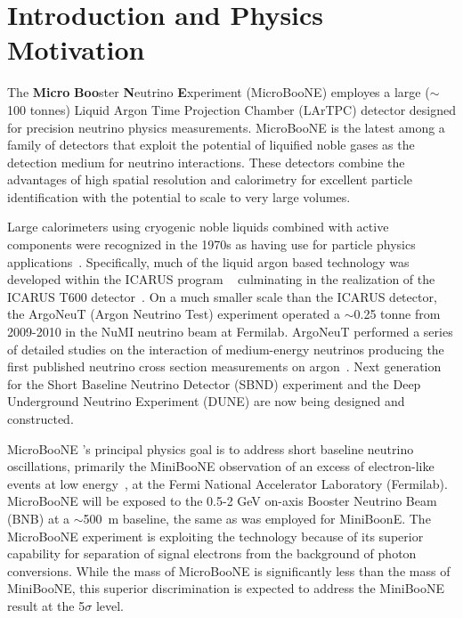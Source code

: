 \section{Introduction and Physics Motivation}

The {\bf{Micro}} {\bf{Boo}}ster {\bf{N}}eutrino {\bf{E}}xperiment (MicroBooNE) employes a large ($\sim$100 tonnes) Liquid Argon Time Projection Chamber (LArTPC) detector designed for precision neutrino physics measurements.   MicroBooNE is the latest among a family of detectors that exploit the potential of liquified noble gases as the detection medium for neutrino interactions.   These detectors combine the advantages of high spatial resolution and calorimetry for excellent particle identification with the potential to scale to very large volumes. 

Large calorimeters using cryogenic noble liquids combined with active components were recognized in the 1970s as having use for particle physics applications~\cite{Willis:1974}.  Specifically, much of the liquid argon based technology was developed within the ICARUS program ~\cite{Benetti:1993-3ton,Cennini:1994-3ton,Arneodo:1999-50l} culminating in the realization of the ICARUS T600 detector~\cite{Amerio:2004-T600}.  On a much smaller scale than the ICARUS detector, the ArgoNeuT (Argon Neutrino Test) experiment operated a $\sim$0.25 tonne \lartpc from 2009-2010 in the NuMI neutrino beam at Fermilab.   ArgoNeuT performed a series of detailed studies on the interaction of medium-energy neutrinos \cite{Acciarri:2013-argoneut-recomb}  producing the first published neutrino cross section measurements on argon~\cite{Anderson:2012-argoneut-CCincl,Acciarri:2014-argoneut-CCxsec,Acciarri:2014eit}.   Next generation \lartpcs for the Short Baseline Neutrino Detector (SBND) experiment and the Deep Underground Neutrino Experiment (DUNE) are now being designed and constructed.   
   
MicroBooNE 's principal physics goal is to address short baseline neutrino oscillations, primarily the MiniBooNE observation of an excess of electron-like events at low energy~\cite{AguilarArevalo:2008rc}, at the Fermi National Accelerator Laboratory (Fermilab).  MicroBooNE will be exposed to the  0.5-2 GeV on-axis Booster Neutrino Beam (BNB) at a $\sim$500~m baseline, the same as was employed for MiniBoonE.  The MicroBooNE experiment is exploiting the \lartpc technology because of its superior capability for separation of signal electrons from the background of photon conversions.   While the mass of MicroBooNE is significantly less than the mass of MiniBooNE, this superior discrimination is expected to address the MiniBooNE result at the 5$\sigma$ level.   

